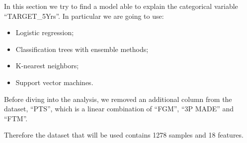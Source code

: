 In this section we try to find a model able to explain the categorical variable ``TARGET\_5Yrs''.
In particular we are going to use:
\begin{itemize}
	\item Logistic regression;
	\item Classification trees with ensemble methods;
	\item K-nearest neighbors;
	\item Support vector machines.
\end{itemize}

Before diving into the analysis, we removed an additional column from the dataset, ``PTS'', which is a linear combination of ``FGM'', ``3P MADE'' and ``FTM''.

Therefore the dataset that will be used contains 1278 samples and 18 features.
